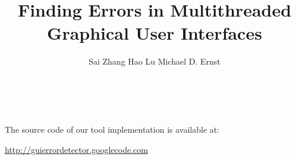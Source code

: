 \documentclass{sig-alternate}
\begin{document}
\title{Finding Errors in Multithreaded Graphical User Interfaces}


\author{
\alignauthor Sai Zhang \quad Hao Lu \quad Michael D. Ernst\\
       \\
       \\
}


\maketitle
















The source code of our tool implementation is available at:

\vspace{1mm}

\noindent \url{http://guierrordetector.googlecode.com}


\vspace{2mm}




\footnotesize{

}
\end{document}
